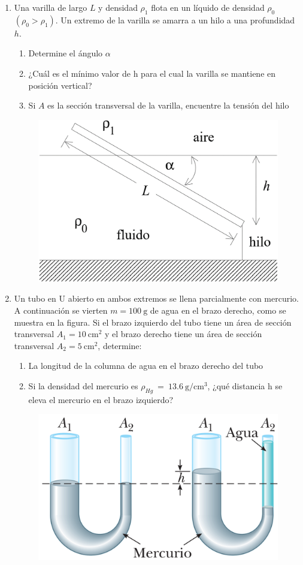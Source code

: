 \documentclass[letterpaper,11pt]{article}
\begin{document}
\begin{enumerate}
\item Una varilla de largo $L$ y densidad $\rho_1$ flota en un líquido de densidad $\rho_0$ $\left(\rho_0 > \rho_1\right)$. Un extremo de la varilla se amarra a un hilo a una profundidad $h$.

\begin{multicols}{2}
    \begin{enumerate}
        \item Determine el ángulo $\alpha$
        \item ¿Cuál es el mínimo valor de h para el cual la varilla se mantiene en posición vertical?
        \item Si $A$ es la sección transversal de la varilla, encuentre la tensión del hilo
    \end{enumerate}
    
    \columnbreak
    
    \begin{figure}[H]
        \centering
        \includegraphics[width=0.55\linewidth]{2021-2/img/aux13/p1.png}
    \end{figure}
\end{multicols}

\item Un tubo en U abierto en ambos extremos se llena parcialmente con mercurio. A continuación se vierten $m=\SI{100}{\g}$ de agua en el brazo derecho, como se muestra en la figura. Si el brazo izquierdo del tubo tiene un área de sección transversal $A_1=\SI{10}{\cm^2}$ y el brazo derecho tiene un área de sección transversal $A_2=\SI{5}{\cm^2}$, determine:
\begin{multicols}{2}
    \begin{enumerate}
        \item La longitud de la columna de agua en el brazo derecho del tubo
        \item Si la densidad del mercurio es $\rho_{Hg}~=~\SI{13.6}{\g/\cm^3}$, ¿qué distancia h se eleva el mercurio en el brazo izquierdo?
    \end{enumerate}
    \columnbreak
    \begin{figure}[H]
        \centering
        \includegraphics[width=0.5\linewidth]{2021-2/img/aux13/p2.png}
    \end{figure}
\end{multicols}


\end{enumerate}
\end{document}
